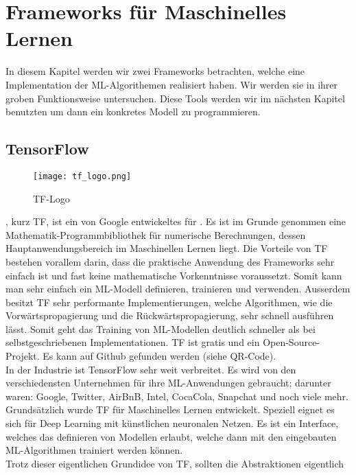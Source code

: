 
\chapter{Frameworks für Maschinelles Lernen}
In diesem Kapitel werden wir zwei Frameworks betrachten, welche eine
Implementation der ML-Algorithemen realisiert haben. Wir werden sie in ihrer
groben Funktionsweise untersuchen. Diese Tools werden wir im
nächsten Kapitel benutzten um dann ein konkretes Modell zu programmieren.

\section{TensorFlow}\label{sec:tensorflow}
\begin{wrapfigure}{l}{3cm}
  \texttt{[image: tf\_logo.png]}
  \caption{TF-Logo}
\end{wrapfigure}
, kurz TF, ist ein von Google entwickeltes  für
. Es ist im Grunde genommen eine
Mathematik-Programmbibliothek für numerische Berechnungen, dessen Hauptanwendungsbereich im Maschinellen Lernen
liegt. Die Vorteile von TF bestehen vorallem darin, dass die praktische
Anwendung des Frameworks sehr
einfach ist und fast keine mathematische Vorkenntnisse voraussetzt. Somit kann
man sehr einfach ein ML-Modell definieren, trainieren und verwenden. Ausserdem
besitzt TF sehr performante Implementierungen, welche Algorithmen, wie die
Vorwärtspropagierung und die Rückwärtspropagierung, sehr schnell ausführen
lässt. Somit geht das Training von ML-Modellen deutlich schneller als bei
selbstgeschriebenen Implementationen.
TF ist gratis und ein Open-Source-Projekt. Es kann auf Github gefunden werden
(siehe QR-Code). \\
\para{}
In der Industrie ist TensorFlow sehr weit verbreitet. Es wird von den
verschiedensten Unternehmen für ihre ML-Anwendungen gebraucht; darunter waren:
Google, Twitter, AirBnB, Intel, CocaCola, Snapchat und noch viele mehr.
\para{}
Grundsätzlich wurde TF für Maschinelles Lernen entwickelt. Speziell eignet es
sich für Deep Learning mit künstlichen neuronalen Netzen. Es ist ein
Interface, welches das definieren von Modellen erlaubt, welche dann mit den
eingebauten ML-Algorithmen trainiert werden können. \\
Trotz dieser eigentlichen Grundidee von TF, sollten die Abstraktionen eigentlich
